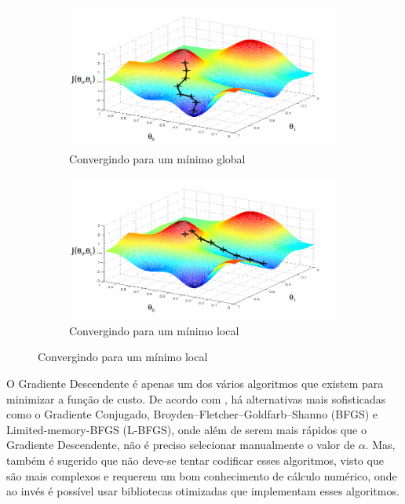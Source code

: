 \begin{figure}
  \caption{Funcionamento do Gradiente Descendente}
  \begin{subfigure}[htb]{0.5\textwidth} 
    \includegraphics[width=\textwidth]{img/funcgraddesc1}
    \caption{Convergindo para um mínimo global} \label{fig:funcgraddesc}
  \end{subfigure}
  \begin{subfigure}[htb]{0.5\textwidth} 
    \includegraphics[width=\textwidth]{img/funcgraddesc2}
    \caption{Convergindo para um mínimo local} \label{fig:funcgraddescnot}
  \end{subfigure}

\end{figure}

O Gradiente Descendente é apenas um dos vários algoritmos que existem para minimizar a função de custo. De acordo com , há alternativas mais sofisticadas como o Gradiente Conjugado, Broyden–Fletcher–Goldfarb–Shanno (BFGS) e Limited-memory-BFGS (L-BFGS), onde além de serem mais rápidos que o Gradiente Descendente, não é preciso selecionar manualmente o valor de $\alpha$. Mas, também é sugerido que não deve-se tentar codificar esses algoritmos, visto que são mais complexos e requerem um bom conhecimento de cálculo numérico, onde ao invés é possível usar bibliotecas otimizadas que implementam esses algoritmos.


